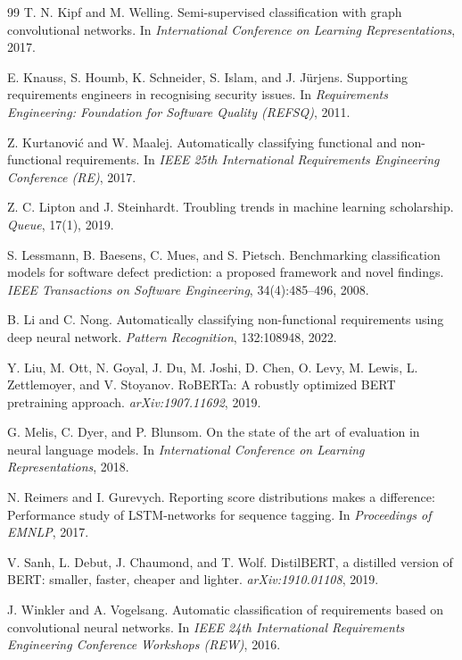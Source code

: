 \documentclass[11pt,a4paper]{article}
\begin{document}
\begin{thebibliography}{99}
 T. N. Kipf and M. Welling. Semi-supervised classification with graph
convolutional networks. In \emph{International Conference on Learning Representations},
2017.

 E. Knauss, S. Houmb, K. Schneider, S. Islam, and J. Jürjens.
Supporting requirements engineers in recognising security issues. In \emph{Requirements
Engineering: Foundation for Software Quality (REFSQ)}, 2011.

 Z. Kurtanović and W. Maalej. Automatically classifying functional
and non-functional requirements. In \emph{IEEE 25th International Requirements Engineering
Conference (RE)}, 2017.

 Z. C. Lipton and J. Steinhardt. Troubling trends in machine learning
scholarship. \emph{Queue}, 17(1), 2019.

 S. Lessmann, B. Baesens, C. Mues, and S. Pietsch. Benchmarking
classification models for software defect prediction: a proposed framework and novel findings.
\emph{IEEE Transactions on Software Engineering}, 34(4):485--496, 2008.

 B. Li and C. Nong. Automatically classifying non-functional requirements using
deep neural network. \emph{Pattern Recognition}, 132:108948, 2022.

 Y. Liu, M. Ott, N. Goyal, J. Du, M. Joshi, D. Chen, O. Levy,
M. Lewis, L. Zettlemoyer, and V. Stoyanov. RoBERTa: A robustly optimized BERT pretraining
approach. \emph{arXiv:1907.11692}, 2019.

 G. Melis, C. Dyer, and P. Blunsom. On the state of the art of
evaluation in neural language models. In \emph{International Conference on Learning
Representations}, 2018.

 N. Reimers and I. Gurevych. Reporting score distributions makes a
difference: Performance study of LSTM-networks for sequence tagging. In \emph{Proceedings of EMNLP}, 2017.

 V. Sanh, L. Debut, J. Chaumond, and T. Wolf. DistilBERT, a distilled
version of BERT: smaller, faster, cheaper and lighter. \emph{arXiv:1910.01108}, 2019.

 J. Winkler and A. Vogelsang. Automatic classification of
requirements based on convolutional neural networks. In \emph{IEEE 24th International
Requirements Engineering Conference Workshops (REW)}, 2016.


\end{thebibliography}
\end{document}
